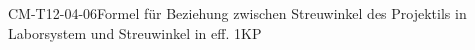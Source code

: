 
\begin{CONC}{CM-T12-04-06}{Formel für Beziehung zwischen Streuwinkel des Projektils in Laborsystem und Streuwinkel in eff. 1KP}
\end{CONC}

